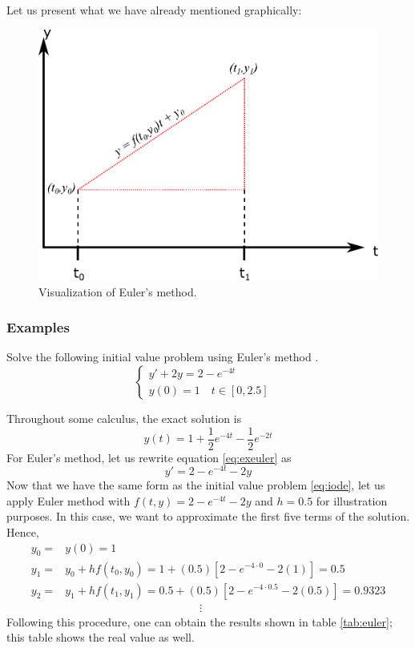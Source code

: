 Let us present what we have already mentioned graphically:
\begin{figure}[H]
    \centering
    \includegraphics[scale=0.4]{files/graphicEuler.pdf}
    \caption{Visualization of Euler's method.}
    \label{fig:visualEuler}
\end{figure}

\subsubsection{Examples}
\begin{exmp} \label{ex:r_e}
Solve the following initial value problem using Euler's method \cite{exampleeuler}.
\begin{equation}
\begin{cases}
    y'+2y=2-e^{-4t}&\\ y(0)=1\quad t\in[0,2.5]&
\end{cases}
\end{equation}\label{eq:exeuler}
\end{exmp}
Throughout some calculus, the exact solution is
\begin{equation}
    y(t)=1+\dfrac{1}{2}e^{-4t}-\dfrac{1}{2}e^{-2t}
\end{equation}
For Euler's method, let us rewrite equation \eqref{eq:exeuler} as 
\begin{equation*}
    y'=2-e^{-4t}-2y
\end{equation*}
Now that we have the same form as the initial value problem \eqref{eq:iode}, let us apply Euler method with $f(t,y)=2-e^{-4t}-2y$ and $h=0.5$ for illustration purposes. In this case, we want to approximate the first five terms of the solution. Hence,
\begin{align*}
    y_0 =& y(0) = 1\\
    y_1 =& y_0+hf(t_0,y_0)= 1 + (0.5)\left[2-e^{-4\cdot0}-2(1)\right]=0.5\\
    y_2 =& y_1+hf(t_1,y_1) = 0.5 + (0.5)\left[2-e^{-4\cdot0.5}-2(0.5)\right]=0.9323\\
    &\qquad\qquad\qquad\qquad\qquad\qquad\vdots
\end{align*}
Following this procedure, one can obtain the results shown in table \ref{tab:euler}; this table shows the real value as well.

